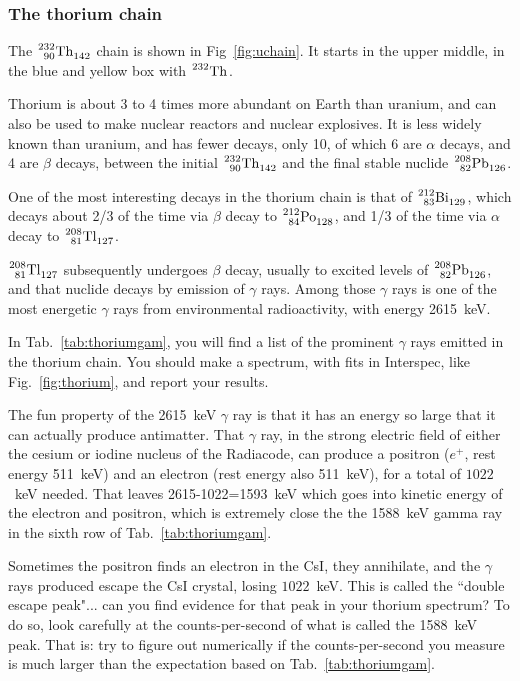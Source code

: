 \documentclass[12pt]{article}
\def\elem#1#2#3#4#5{{%
   \phantom{{}^{#2}_{#3}}%
   {\vphantom{\rm#1}}^{\llapscr{#2}}_{\llapscr{#3}}%
   {\rm#1}^{#4}_{#5}%
}}
\def\llapscr#1{\llap{$\scriptstyle#1$}}
\begin{document}
\FloatBarrier

\hbox{}

\subsubsection{The thorium chain}

The $\elem{Th}{232}{90}{}{142}$ chain is shown in Fig~\ref{fig:uchain}.  It starts in the upper middle, in the blue and yellow box with $\elem{Th}{232}{}{}{}$.

Thorium is about 3 to 4 times more abundant on Earth than uranium, and can also be used to make nuclear reactors and nuclear explosives.   It is less widely known than uranium, and has fewer decays, only 10, of which 6 are $\alpha$ decays, and 4 are $\beta$ decays, between the initial $\elem{Th}{232}{90}{}{142}$  and the final stable nuclide $\elem{Pb}{208}{82}{}{126}$.

One of the most interesting decays in the thorium chain is that of $\elem{Bi}{212}{83}{}{129}$, which decays about 2/3 of the time via $\beta$ decay to $\elem{Po}{212}{84}{}{128}$, and 1/3 of the time via $\alpha$ decay to $\elem{Tl}{208}{81}{}{127}$.

$\elem{Tl}{208}{81}{}{127}$ subsequently undergoes $\beta$ decay, usually to excited levels of $\elem{Pb}{208}{82}{}{126}$, and that nuclide decays by emission of $\gamma$ rays.  Among those $\gamma$ rays is one of the most energetic $\gamma$ rays from environmental radioactivity, with energy 2615~keV.

In Tab.~\ref{tab:thoriumgam}, you will find a list of the prominent $\gamma$ rays emitted in the thorium chain.  You should make a spectrum, with fits in Interspec, like Fig.~\ref{fig:thorium}, and report your results.

The fun property of the 2615~keV $\gamma$ ray is that it has an energy so large that it can actually produce antimatter.  That $\gamma$ ray, in the strong electric field of either the cesium or iodine nucleus of the Radiacode, can produce a positron ($e^+$, rest energy 511~keV) and an electron (rest energy also 511~keV), for a total of $1022$~keV needed.  That leaves 2615-1022=1593~keV which goes into kinetic energy of the electron and positron, which is extremely close the the 1588~keV gamma ray in the sixth row of Tab.~\ref{tab:thoriumgam}.

Sometimes the positron finds an electron in the CsI, they annihilate, and the $\gamma$ rays produced escape the CsI crystal, losing $1022$~keV.  This is called the ``double escape peak"... can you find evidence for that peak in your thorium spectrum?   To do so, look carefully at the counts-per-second of what is called the 1588~keV peak.   That is: try to figure out numerically if the counts-per-second you measure is much larger than the expectation based on Tab.~\ref{tab:thoriumgam}.
\end{document}
